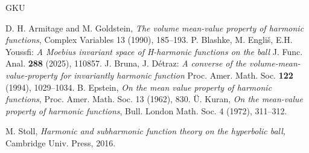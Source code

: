 \documentclass[12pt]{amsart}
\numberwithin{equation}{section}
\theoremstyle{plain}
\numberwithin{equation}{section}
\numberwithin{theorem}{section}
\numberwithin{proposition}{section}
\begin{document}
\begin{thebibliography}{GKU}

D. H. Armitage and M. Goldstein,
\emph{The volume mean-value property of harmonic functions},
Complex Variables 13 (1990), 185--193.
 P. Blashke, M. Engli\v s, E.H. Youssfi: {\it A Moebius invariant space of H-harmonic functions on the ball} J. Func. Anal. {\bf 288} (2025), 110857.
 J. Bruna, J. D\'etraz: {\it A converse of the  volume-mean-value-property
for invariantly harmonic function} Proc. Amer. Math. Soc. {\bf 122} (1994), 1029--1034.
B. Epstein,
\emph{On the mean value property of harmonic functions},
Proc. Amer. Math. Soc. 13 (1962), 830.
\"U. Kuran,
\emph{On the mean-value property of harmonic functions},
Bull. London Math. Soc. 4 (1972), 311--312.

 M. Stoll, {\it Harmonic and subharmonic function theory on the hyperbolic ball,\/} Cambridge Univ. Press, 2016.

\end{thebibliography}
\end{document}
